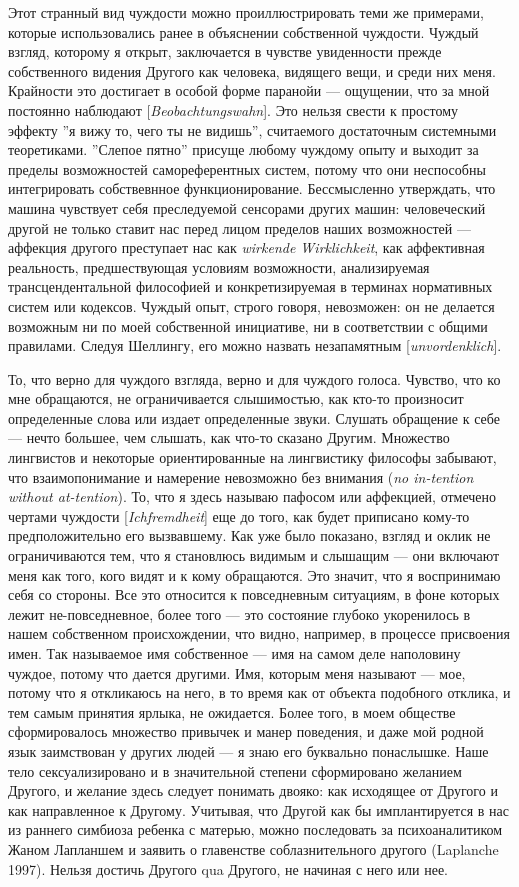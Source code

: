 \documentclass[12pt]{book}
\begin{document}
Этот странный вид чуждости можно проиллюстрировать теми же примерами, которые использовались ранее в объяснении собственной чуждости. Чуждый взгляд, которому я открыт, заключается в чувстве увиденности прежде собственного видения Другого как человека, видящего вещи, и среди них меня. Крайности это достигает в особой форме паранойи --- ощущении, что за мной постоянно наблюдают [\textit{Beobachtungswahn}]. Это нельзя свести к простому эффекту ''я вижу то, чего ты не видишь'', считаемого достаточным системными теоретиками. ''Слепое пятно'' присуще любому чуждому опыту и выходит за пределы возможностей самореферентных систем, потому что они неспособны интегрировать собствевнное функционирование. Бессмысленно утверждать, что машина чувствует себя преследуемой сенсорами других машин: человеческий другой не только ставит нас перед лицом пределов наших возможностей --- аффекция другого преступает нас как \textit{wirkende Wirklichkeit}, как аффективная реальность, предшествующая условиям возможности, анализируемая трансцендентальной философией и конкретизируемая в терминах нормативных систем или кодексов. Чуждый опыт, строго говоря, невозможен: он не делается возможным ни по моей собственной инициативе, ни в соответствии с общими правилами. Следуя Шеллингу, его можно назвать незапамятным [\textit{unvordenklich}].

То, что верно для чуждого взгляда, верно и для чуждого голоса. Чувство, что ко мне обращаются, не ограничивается слышимостью, как кто-то произносит определенные слова или издает определенные звуки. Слушать обращение к себе --- нечто большее, чем слышать, как что-то сказано Другим. Множество лингвистов и некоторые ориентированные на лингвистику философы забывают, что взаимопонимание и намерение невозможно без внимания (\textit{no in-tention without at-tention}). То, что я здесь называю пафосом или аффекцией, отмечено чертами чуждости [\textit{Ichfremdheit}] еще до того, как будет приписано кому-то предположительно его вызвавшему. Как уже было показано, взгляд и оклик не ограничиваются тем, что я становлюсь видимым и слышащим --- они включают меня как того, кого видят и к кому обращаются. Это значит, что я воспринимаю себя со стороны. Все это относится к повседневным ситуациям, в фоне которых лежит не-повседневное, более того --- это состояние глубоко укоренилось в нашем собственном происхождении, что видно, например, в процессе присвоения имен. Так называемое имя собственное --- имя на самом деле наполовину чуждое, потому что дается другими. Имя, которым меня называют --- мое, потому что я откликаюсь на него, в то время как от объекта подобного отклика, и тем самым принятия ярлыка, не ожидается. Более того, в моем обществе сформировалось множество привычек и манер поведения, и даже мой родной язык заимствован у других людей --- я знаю его буквально понаслышке. Наше тело сексуализировано и в значительной степени сформировано желанием Другого, и желание здесь следует понимать двояко: как исходящее от Другого и как направленное к Другому. Учитывая, что Другой как бы имплантируется в нас из раннего симбиоза ребенка с матерью, можно последовать за психоаналитиком Жаном Лапланшем и заявить о главенстве соблазнительного другого (Laplanche 1997). Нельзя достичь Другого qua Другого, не начиная с него или нее.
\end{document}

